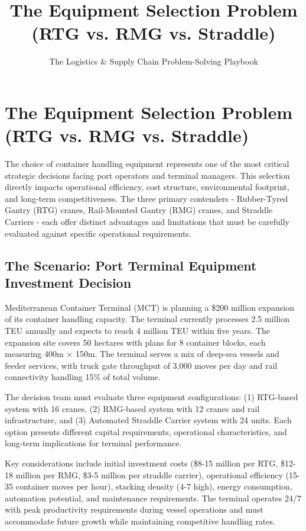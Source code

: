 \documentclass{article}
\title{The Equipment Selection Problem (RTG vs. RMG vs. Straddle)}
\author{The Logistics \& Supply Chain Problem-Solving Playbook}
\date{}
\begin{document}
\maketitle

\section{The Equipment Selection Problem (RTG vs. RMG vs. Straddle)}

The choice of container handling equipment represents one of the most critical strategic decisions facing port operators and terminal managers. This selection directly impacts operational efficiency, cost structure, environmental footprint, and long-term competitiveness. The three primary contenders - Rubber-Tyred Gantry (RTG) cranes, Rail-Mounted Gantry (RMG) cranes, and Straddle Carriers - each offer distinct advantages and limitations that must be carefully evaluated against specific operational requirements.

\subsection{The Scenario: Port Terminal Equipment Investment Decision}

Mediterranean Container Terminal (MCT) is planning a \$200 million expansion of its container handling capacity. The terminal currently processes 2.5 million TEU annually and expects to reach 4 million TEU within five years. The expansion site covers 50 hectares with plans for 8 container blocks, each measuring 400m × 150m. The terminal serves a mix of deep-sea vessels and feeder services, with truck gate throughput of 3,000 moves per day and rail connectivity handling 15\% of total volume.

The decision team must evaluate three equipment configurations: (1) RTG-based system with 16 cranes, (2) RMG-based system with 12 cranes and rail infrastructure, and (3) Automated Straddle Carrier system with 24 units. Each option presents different capital requirements, operational characteristics, and long-term implications for terminal performance.

Key considerations include initial investment costs (\$8-15 million per RTG, \$12-18 million per RMG, \$3-5 million per straddle carrier), operational efficiency (15-35 container moves per hour), stacking density (4-7 high), energy consumption, automation potential, and maintenance requirements. The terminal operates 24/7 with peak productivity requirements during vessel operations and must accommodate future growth while maintaining competitive handling rates.
\end{document}
